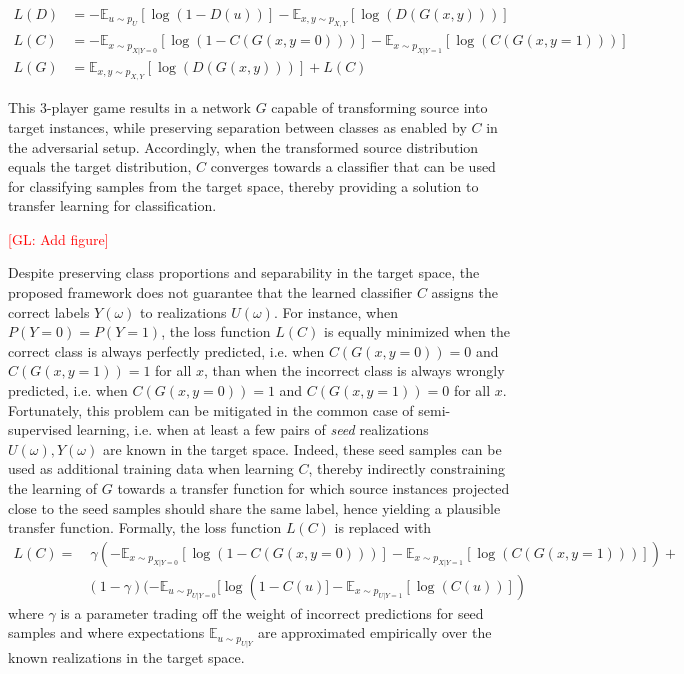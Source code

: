 \documentclass{article}
\newcommand{\glnote}[1]{\textcolor{red}{[GL: #1]}}
\theoremstyle{plain}
\begin{document}
\begin{align}
    L(D) &= -\mathbb{E}_{u \sim p_U} [\log(1 - D(u))] -\mathbb{E}_{x,y \sim p_{X,Y}} [\log(D(G(x, y)))] \\
    L(C) &= -\mathbb{E}_{x \sim p_{X|Y=0}} [\log(1 - C(G(x, y=0)))] -\mathbb{E}_{x \sim p_{X|Y=1}} [\log(C(G(x, y=1)))] \\
    L(G) &= \mathbb{E}_{x,y \sim p_{X,Y}} [\log(D(G(x, y)))] + L(C)
\end{align}

This 3-player game results in a network $G$
capable of transforming source into target instances, while preserving
separation between classes as enabled by $C$ in the adversarial setup.
Accordingly, when the transformed source distribution equals the
target distribution, $C$ converges towards a classifier that can be used
for classifying samples from the target space, thereby providing a solution
to transfer learning for classification.

\glnote{Add figure}

Despite preserving class proportions and separability in the target space, the
proposed framework does not guarantee that the learned classifier $C$ assigns
the correct labels $Y(\omega)$ to realizations $U(\omega)$. For instance, when
$P(Y=0) = P(Y=1)$, the loss function $L(C)$ is equally minimized when the
correct class is always perfectly predicted, i.e. when $C(G(x,y=0)) = 0$ and
$C(G(x,y=1)) = 1$ for all $x$, than when the incorrect class is always wrongly
predicted,  i.e. when $C(G(x,y=0)) = 1$ and $C(G(x,y=1)) = 0$ for all $x$.
Fortunately, this problem can be mitigated in the common case of
semi-supervised learning, i.e. when at least a few pairs of {\it seed}
realizations $U(\omega), Y(\omega)$ are known in the target space. Indeed, these
seed samples can be used as additional training data when learning $C$, thereby
indirectly constraining the learning of $G$ towards a transfer function for
which source instances projected close to the seed samples should share the same
label, hence yielding a plausible transfer function. Formally,
the loss function $L(C)$ is replaced with
\begin{align}\label{eqn:loss-C-semi}
    L(C) =&~ \gamma (-\mathbb{E}_{x \sim p_{X|Y=0}} [\log(1 - C(G(x, y=0)))] -\mathbb{E}_{x \sim p_{X|Y=1}} [\log(C(G(x, y=1)))]) + \nonumber \\
          & (1 - \gamma) (-\mathbb{E}_{u \sim p_{U|Y=0}} [\log(1 - C(u)] -\mathbb{E}_{x \sim p_{U|Y=1}} [\log(C(u))])
\end{align}
where $\gamma$ is a parameter trading off the weight of incorrect predictions for seed samples
and where expectations $\mathbb{E}_{u \sim p_{U|Y}}$ are approximated empirically
over the known realizations in the target space.
\end{document}
